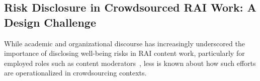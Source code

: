 

\subsection{Risk Disclosure in Crowdsourced RAI Work: A Design Challenge}
While academic and organizational discourse has increasingly underscored the importance of disclosing well-being risks in RAI content work, particularly for employed roles such as content moderators~\cite{bharucha2023content, qian2025locating}, less is known about how such efforts are operationalized in crowdsourcing contexts. %


